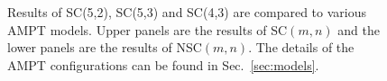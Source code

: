 \begin{figure}[h]
\begin{center}
        \caption{Results of  SC(5,2), SC(5,3) and SC(4,3) are compared to various AMPT models. Upper panels are the results of SC$(m,n)$ and the lower panels are the results of NSC$(m,n)$. The details of the AMPT configurations can be found in Sec.~\ref{sec:models}.}
        \label{fig:Figure_7}
        \end{center}   
 \end{figure}
 
